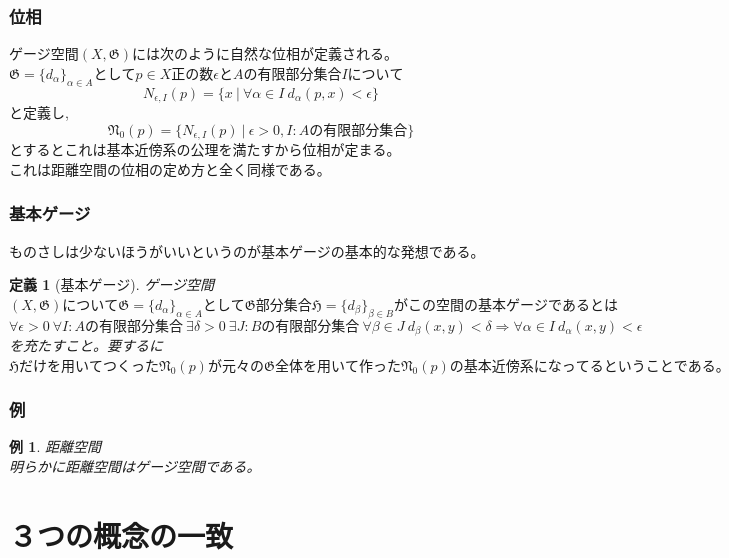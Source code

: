 \documentclass[leqno]{jsarticle}
\newtheorem{df}[thm]{定義}
\newtheorem{exam}[thm]{例}
\begin{document}
\section{位相}
ゲージ空間$(X,\mathfrak{G})$には次のように自然な位相が定義される。\\
$\mathfrak{G}=\{d_{\alpha} \}_{\alpha\in A} としてp\in X正の数\epsilon とAの有限部分集合Iについて$
\[
N_{\epsilon,I}(p)=\{x\ |\ \forall \alpha \in I\ d_{\alpha}(p,x)<\epsilon \}
\]と定義し,
\[
\mathfrak{N}_{0}(p)=\{N_{\epsilon,I}(p)\ |\ \epsilon >0,I:Aの有限部分集合\}
\]とするとこれは基本近傍系の公理を満たすから位相が定まる。\\
これは距離空間の位相の定め方と全く同様である。
\section{基本ゲージ}
ものさしは少ないほうがいいというのが基本ゲージの基本的な発想である。
\begin{df}[基本ゲージ]ゲージ空間$(X,\mathfrak{G})について\mathfrak{G}=\{d_{\alpha} \}_{\alpha\in A} として\mathfrak{G}部分集合\mathfrak{H}=\{d_{\beta} \}_{\beta\in B}がこの空間の基本ゲージであるとは $
\[
\forall \epsilon>0\ \forall I:Aの有限部分集合\ \exists \delta>0\  \exists J:Bの有限部分集合\ \forall \beta \in J\ d_{\beta}(x,y)<\delta \Rightarrow \forall \alpha \in I\ d_{\alpha}(x,y)<\epsilon
\]を充たすこと。要するに$\mathfrak{H}だけを用いてつくった\mathfrak{N}_{0}(p)が元々の\mathfrak{G}全体を用いて作った\mathfrak{N}_{0}(p)	の基本近傍系になってるということである。$
\end{df}
\section{例}
\begin{exam}距離空間\\
明らかに距離空間はゲージ空間である。
\end{exam}



\newpage
\part{３つの概念の一致}
\end{document}
